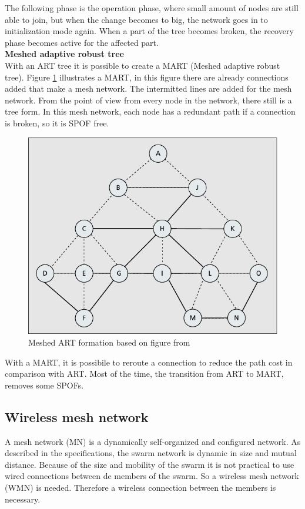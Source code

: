 \documentclass[10pt,a4paper]{article}
\begin{document}
The following phase is the operation phase, where small amount of nodes are still able to join, but when the change becomes to big, the network goes in to initialization mode again. When a part of the tree becomes broken, the recovery phase becomes active for the affected part.\\

\textbf{Meshed adaptive robust tree}\\
With an ART tree it is possible to create a MART (Meshed adaptive robust tree). Figure \ref{fig:meshtree} illustrates a MART, in this figure there are already connections added that make a mesh network. The intermitted lines are added for the mesh network. From the point of view from every node in the network, there still is a tree form. In this mesh network, each node has a redundant path if a connection is broken, so it is SPOF free.

\begin{figure}[H]
   \centering
   \includegraphics[width=1\textwidth]{meshtree}
   \caption{Meshed ART formation based on figure from \cite{emergingstandarsforwirelessmeshtechnology}}
   \label{fig:meshtree}
\end{figure}

With a MART, it is possibile to reroute a connection to reduce the path cost in comparison with ART. Most of the time, the transition from ART to MART, removes some SPOFs.

\subsection{Wireless mesh network}
A mesh network (MN) is a dynamically self-organized and configured network. \cite{WMN1} As described in the specifications, the swarm network is dynamic in size and mutual distance. Because of the size and mobility of the swarm it is not practical to use wired connections between de members of the swarm. So a wireless mesh network (WMN) is needed. Therefore a wireless connection between the members is necessary.
\end{document}

